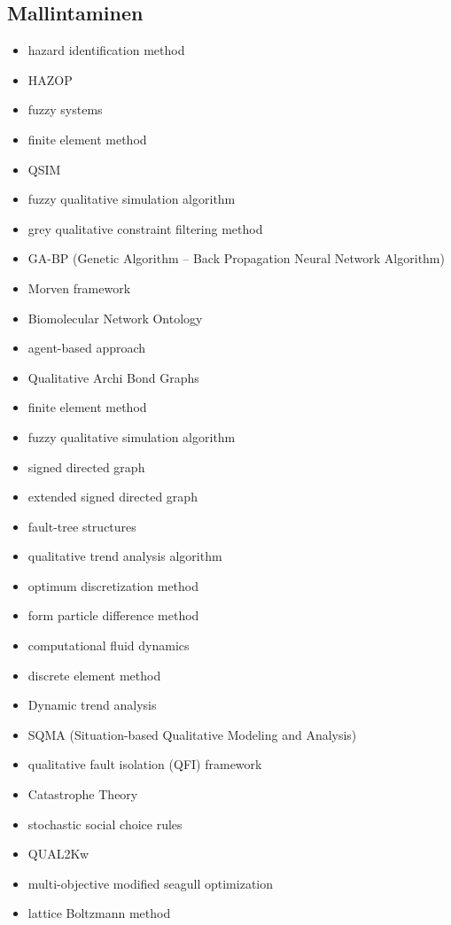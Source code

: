 \documentclass[utf8]{gradu3}
\begin{document}
\subsection{Mallintaminen}
\begin{itemize}
    \item hazard identification method
    \item HAZOP
    \item fuzzy systems 
    \item finite element method 
    \item QSIM 
    \item fuzzy qualitative simulation algorithm 
    \item grey qualitative constraint filtering method 
    \item GA-BP (Genetic Algorithm – Back Propagation Neural Network Algorithm) 
    \item Morven framework 
    \item Biomolecular Network Ontology 
    \item agent-based approach 
    \item Qualitative Archi Bond Graphs 
    \item finite element method 
    \item fuzzy qualitative simulation algorithm 
    \item signed directed graph 
    \item extended signed directed graph 
    \item fault-tree structures 
    \item qualitative trend analysis algorithm 
    \item optimum discretization method 
    \item form particle difference method 
    \item computational fluid dynamics 
    \item discrete element method 
    \item Dynamic trend analysis 
    \item SQMA (Situation-based Qualitative Modeling and Analysis) 
    \item qualitative fault isolation (QFI) framework 
    \item Catastrophe Theory 
    \item stochastic social choice rules 
    \item QUAL2Kw 
    \item multi-objective modified seagull optimization 
    \item lattice Boltzmann method 

\end{itemize}
\end{document}
